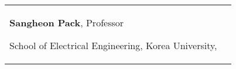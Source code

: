 

\begin{tabularx}{\textwidth}{@{}X X@{}}
\textbf{Sangheon Pack}, Professor\par
School of Electrical Engineering, Korea University,\par 
\makefield{\faEnvelope}{\url{shpack@korea.ac.kr}}
\end{tabularx}
